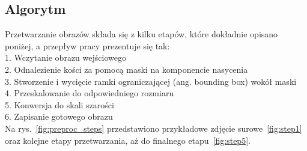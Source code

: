 \subsection{Algorytm}\label{subsec:algorytm}

Przetwarzanie obrazów składa się z kilku etapów, które dokładnie opisano poniżej, a przepływ pracy prezentuje się tak: \\
1. Wczytanie obrazu wejściowego \\
2. Odnalezienie kości za pomocą maski na komponencie nasycenia \\
3. Stworzenie i wycięcie ramki ograniczającej (ang. bounding box) wokół maski \\
4. Przeskalowanie do odpowiedniego rozmiaru \\
5. Konwersja do skali szarości \\
6. Zapisanie gotowego obrazu \\


Na rys.~\ref{fig:preproc_steps} przedstawiono przykładowe zdjęcie surowe~\ref{fig:step1}
oraz kolejne etapy przetwarzania, aż do finalnego etapu~\ref{fig:step5}.

